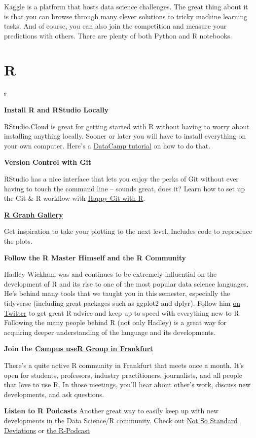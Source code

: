 \documentclass[
  11pt,
]{book}
\begin{document}
Kaggle is a platform that hosts data science challenges. The great thing
about it is that you can browse through many clever solutions to tricky
machine learning tasks. And of course, you can also join the competition
and measure your predictions with others. There are plenty of both
Python and R notebooks.

\hypertarget{r}{%
\section{R}\label{r}}

\begin{tips}r

\textbf{Install R and RStudio Locally}

RStudio.Cloud is great for getting started with R without having to
worry about installing anything locally. Sooner or later you will have
to install everything on your own computer. Here's a
\href{https://www.datacamp.com/community/tutorials/installing-R-windows-mac-ubuntu}{DataCamp
tutorial} on how to do that.

\textbf{Version Control with Git}

RStudio has a nice interface that lets you enjoy the perks of Git
without ever having to touch the command line -- sounds great, does it?
Learn how to set up the Git \& R workflow with
\href{https://happygitwithr.com/}{Happy Git with R}.

\textbf{\href{https://www.r-graph-gallery.com/}{R Graph Gallery}}

Get inspiration to take your plotting to the next level. Includes code
to reproduce the plots.

\textbf{Follow the R Master Himself and the R Community}

Hadley Wickham was and continues to be extremely influential on the
development of R and its rise to one of the most popular data science
languages. He's behind many tools that we taught you in this semester,
especially the tidyverse (including great packages such as ggplot2 and
dplyr). Follow him \href{https://twitter.com/hadleywickham}{on Twitter}
to get great R advice and keep up to speed with everything new to R.
Following the many people behind R (not only Hadley) is a great way for
acquiring deeper understanding of the language and its developments.

\textbf{Join the \href{https://www.meetup.com/r-frankfurt/}{Campus useR
Group in Frankfurt}}

There's a quite active R community in Frankfurt that meets once a month.
It's open for students, professors, industry practitioners, journalists,
and all people that love to use R. In those meetings, you'll hear about
other's work, discuss new developments, and ask questions.

\textbf{Listen to R Podcasts} Another great way to easily keep up with
new developments in the Data Science/R community. Check out
\href{http://nssdeviations.com/}{Not So Standard Deviations} or
\href{https://r-podcast.org/}{the R-Podcast}

\end{tips}
\end{document}
